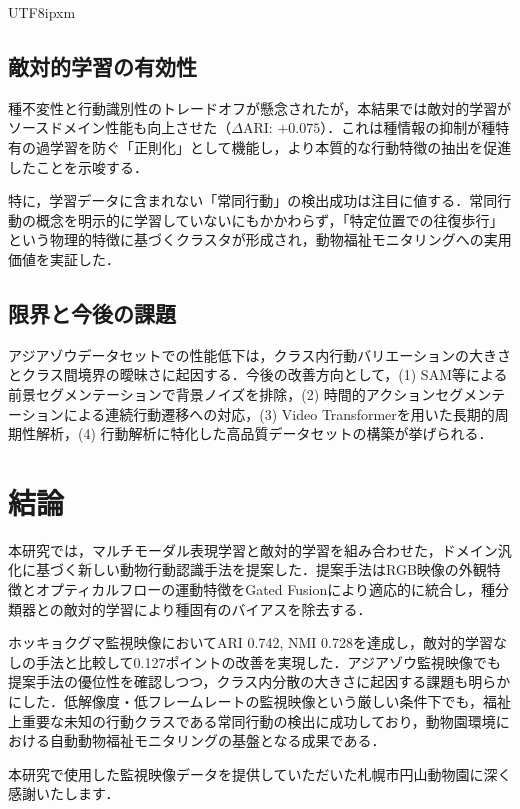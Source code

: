 \documentclass[twocolumn]{svjour3}
\begin{document}
\begin{CJK}{UTF8}{ipxm}
\subsection{敵対的学習の有効性}

種不変性と行動識別性のトレードオフが懸念されたが，本結果では敵対的学習がソースドメイン性能も向上させた（$\Delta$ARI: $+0.075$）．これは種情報の抑制が種特有の過学習を防ぐ「正則化」として機能し，より本質的な行動特徴の抽出を促進したことを示唆する．

特に，学習データに含まれない「常同行動」の検出成功は注目に値する．常同行動の概念を明示的に学習していないにもかかわらず，「特定位置での往復歩行」という物理的特徴に基づくクラスタが形成され，動物福祉モニタリングへの実用価値を実証した．

\subsection{限界と今後の課題}

アジアゾウデータセットでの性能低下は，クラス内行動バリエーションの大きさとクラス間境界の曖昧さに起因する．今後の改善方向として，(1) SAM\cite{kirillov2023segment}等による前景セグメンテーションで背景ノイズを排除，(2) 時間的アクションセグメンテーションによる連続行動遷移への対応，(3) Video Transformer\cite{bertasius2021space}を用いた長期的周期性解析，(4) 行動解析に特化した高品質データセットの構築が挙げられる．

\section{結論}
\label{sec:conclusion}

本研究では，マルチモーダル表現学習と敵対的学習を組み合わせた，ドメイン汎化に基づく新しい動物行動認識手法を提案した．提案手法はRGB映像の外観特徴とオプティカルフローの運動特徴をGated Fusionにより適応的に統合し，種分類器との敵対的学習により種固有のバイアスを除去する．

ホッキョクグマ監視映像においてARI 0.742, NMI 0.728を達成し，敵対的学習なしの手法と比較して0.127ポイントの改善を実現した．アジアゾウ監視映像でも提案手法の優位性を確認しつつ，クラス内分散の大きさに起因する課題も明らかにした．低解像度・低フレームレートの監視映像という厳しい条件下でも，福祉上重要な未知の行動クラスである常同行動の検出に成功しており，動物園環境における自動動物福祉モニタリングの基盤となる成果である．

\begin{acknowledgements}
本研究で使用した監視映像データを提供していただいた札幌市円山動物園に深く感謝いたします．
\end{acknowledgements}




\end{CJK}
\end{document}
